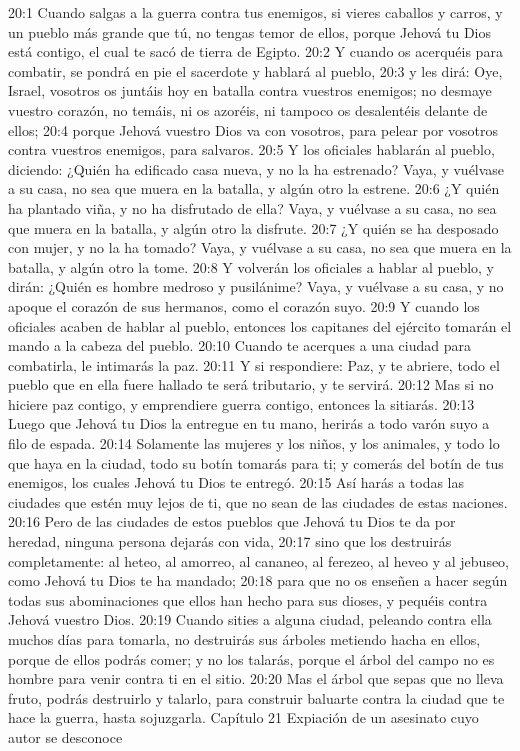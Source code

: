 20:1 Cuando salgas a la guerra contra tus enemigos, si vieres caballos y carros, y un pueblo más grande que tú, no tengas temor de ellos, porque Jehová tu Dios está contigo, el cual te sacó de tierra de Egipto.  
20:2 Y cuando os acerquéis para combatir, se pondrá en pie el sacerdote y hablará al pueblo,  
20:3 y les dirá: Oye, Israel, vosotros os juntáis hoy en batalla contra vuestros enemigos; no desmaye vuestro corazón, no temáis, ni os azoréis, ni tampoco os desalentéis delante de ellos;  
20:4 porque Jehová vuestro Dios va con vosotros, para pelear por vosotros contra vuestros enemigos, para salvaros.  
20:5 Y los oficiales hablarán al pueblo, diciendo: ¿Quién ha edificado casa nueva, y no la ha estrenado? Vaya, y vuélvase a su casa, no sea que muera en la batalla, y algún otro la estrene.  
20:6 ¿Y quién ha plantado viña, y no ha disfrutado de ella? Vaya, y vuélvase a su casa, no sea que muera en la batalla, y algún otro la disfrute.  
20:7 ¿Y quién se ha desposado con mujer, y no la ha tomado? Vaya, y vuélvase a su casa, no sea que muera en la batalla, y algún otro la tome.  
20:8 Y volverán los oficiales a hablar al pueblo, y dirán: ¿Quién es hombre medroso y pusilánime? Vaya, y vuélvase a su casa, y no apoque el corazón de sus hermanos, como el corazón suyo.  
20:9 Y cuando los oficiales acaben de hablar al pueblo, entonces los capitanes del ejército tomarán el mando a la cabeza del pueblo.  
20:10 Cuando te acerques a una ciudad para combatirla, le intimarás la paz.  
20:11 Y si respondiere: Paz, y te abriere, todo el pueblo que en ella fuere hallado te será tributario, y te servirá.  
20:12 Mas si no hiciere paz contigo, y emprendiere guerra contigo, entonces la sitiarás. 
20:13 Luego que Jehová tu Dios la entregue en tu mano, herirás a todo varón suyo a filo de espada.  
20:14 Solamente las mujeres y los niños, y los animales, y todo lo que haya en la ciudad, todo su botín tomarás para ti; y comerás del botín de tus enemigos, los cuales Jehová tu Dios te entregó.  
20:15 Así harás a todas las ciudades que estén muy lejos de ti, que no sean de las ciudades de estas naciones.  
20:16 Pero de las ciudades de estos pueblos que Jehová tu Dios te da por heredad, ninguna persona dejarás con vida,  
20:17 sino que los destruirás completamente: al heteo, al amorreo, al cananeo, al ferezeo, al heveo y al jebuseo, como Jehová tu Dios te ha mandado;  
20:18 para que no os enseñen a hacer según todas sus abominaciones que ellos han hecho para sus dioses, y pequéis contra Jehová vuestro Dios.  
20:19 Cuando sities a alguna ciudad, peleando contra ella muchos días para tomarla, no destruirás sus árboles metiendo hacha en ellos, porque de ellos podrás comer; y no los talarás, porque el árbol del campo no es hombre para venir contra ti en el sitio.  
20:20 Mas el árbol que sepas que no lleva fruto, podrás destruirlo y talarlo, para construir baluarte contra la ciudad que te hace la guerra, hasta sojuzgarla.  
Capítulo 21
Expiación de un asesinato cuyo autor se desconoce  

